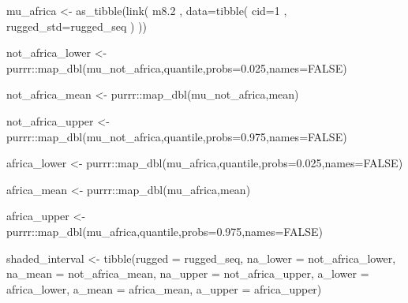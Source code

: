 \documentclass[
]{book}
\newenvironment{Shaded}{\begin{snugshade}}{\end{snugshade}}
\newcommand{\AttributeTok}[1]{\textcolor[rgb]{0.77,0.63,0.00}{#1}}
\newcommand{\ConstantTok}[1]{\textcolor[rgb]{0.00,0.00,0.00}{#1}}
\newcommand{\DecValTok}[1]{\textcolor[rgb]{0.00,0.00,0.81}{#1}}
\newcommand{\FloatTok}[1]{\textcolor[rgb]{0.00,0.00,0.81}{#1}}
\newcommand{\FunctionTok}[1]{\textcolor[rgb]{0.00,0.00,0.00}{#1}}
\newcommand{\NormalTok}[1]{#1}
\newcommand{\OtherTok}[1]{\textcolor[rgb]{0.56,0.35,0.01}{#1}}
\newcommand{\SpecialCharTok}[1]{\textcolor[rgb]{0.00,0.00,0.00}{#1}}
\begin{document}
\begin{Shaded}
\begin{Highlighting}[]
\NormalTok{mu\_africa }\OtherTok{\textless{}{-}} \FunctionTok{as\_tibble}\NormalTok{(}\FunctionTok{link}\NormalTok{( m8}\FloatTok{.2}\NormalTok{ ,}
\AttributeTok{data=}\FunctionTok{tibble}\NormalTok{( }\AttributeTok{cid=}\DecValTok{1}\NormalTok{ , }\AttributeTok{rugged\_std=}\NormalTok{rugged\_seq ) ))}

\NormalTok{not\_africa\_lower }\OtherTok{\textless{}{-}}\NormalTok{ purrr}\SpecialCharTok{::}\FunctionTok{map\_dbl}\NormalTok{(mu\_not\_africa,quantile,}\AttributeTok{probs=}\FloatTok{0.025}\NormalTok{,}\AttributeTok{names=}\ConstantTok{FALSE}\NormalTok{)}

\NormalTok{not\_africa\_mean }\OtherTok{\textless{}{-}}\NormalTok{ purrr}\SpecialCharTok{::}\FunctionTok{map\_dbl}\NormalTok{(mu\_not\_africa,mean)}

\NormalTok{not\_africa\_upper }\OtherTok{\textless{}{-}}\NormalTok{ purrr}\SpecialCharTok{::}\FunctionTok{map\_dbl}\NormalTok{(mu\_not\_africa,quantile,}\AttributeTok{probs=}\FloatTok{0.975}\NormalTok{,}\AttributeTok{names=}\ConstantTok{FALSE}\NormalTok{)}



\NormalTok{africa\_lower }\OtherTok{\textless{}{-}}\NormalTok{ purrr}\SpecialCharTok{::}\FunctionTok{map\_dbl}\NormalTok{(mu\_africa,quantile,}\AttributeTok{probs=}\FloatTok{0.025}\NormalTok{,}\AttributeTok{names=}\ConstantTok{FALSE}\NormalTok{)}

\NormalTok{africa\_mean }\OtherTok{\textless{}{-}}\NormalTok{ purrr}\SpecialCharTok{::}\FunctionTok{map\_dbl}\NormalTok{(mu\_africa,mean)}

\NormalTok{africa\_upper }\OtherTok{\textless{}{-}}\NormalTok{ purrr}\SpecialCharTok{::}\FunctionTok{map\_dbl}\NormalTok{(mu\_africa,quantile,}\AttributeTok{probs=}\FloatTok{0.975}\NormalTok{,}\AttributeTok{names=}\ConstantTok{FALSE}\NormalTok{)}


\NormalTok{shaded\_interval }\OtherTok{\textless{}{-}} \FunctionTok{tibble}\NormalTok{(}\AttributeTok{rugged =}\NormalTok{ rugged\_seq, }\AttributeTok{na\_lower =}\NormalTok{ not\_africa\_lower, }\AttributeTok{na\_mean =}\NormalTok{ not\_africa\_mean, }\AttributeTok{na\_upper =}\NormalTok{ not\_africa\_upper,}
                                               \AttributeTok{a\_lower =}\NormalTok{ africa\_lower, }\AttributeTok{a\_mean =}\NormalTok{ africa\_mean, }\AttributeTok{a\_upper =}\NormalTok{ africa\_upper)}




\end{Highlighting}
\end{Shaded}
\end{document}
